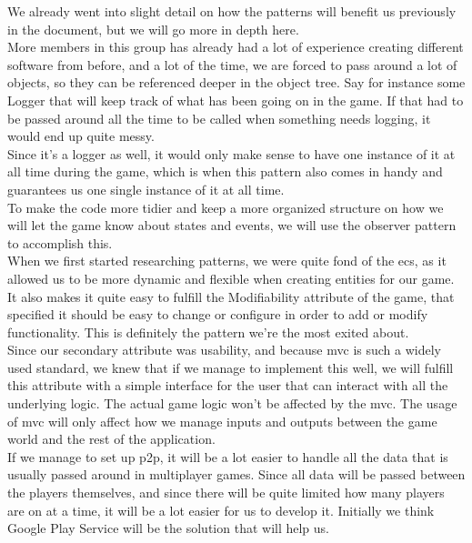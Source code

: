 We already went into slight detail on how the patterns will benefit us previously in the document, but we will go more in depth here. \\

More members in this group has already had a lot of experience creating different software from before, and a lot of the time, we are forced to pass around a lot of objects, so they can be referenced deeper in the object tree. Say for instance some Logger that will keep track of what has been going on in the game. If that had to be passed around all the time to be called when something needs logging, it would end up quite messy. \\

Since it's a logger as well, it would only make sense to have one instance of it at all time during the game, which is when this pattern also comes in handy and guarantees us one single instance of it at all time. \\

To make the code more tidier and keep a more organized structure on how we will let the game know about states and events, we will use the observer pattern to accomplish this. \\

When we first started researching patterns, we were quite fond of the \gls{ecs}, as it allowed us to be more dynamic and flexible when creating entities for our game. It also makes it quite easy to fulfill the Modifiability attribute of the game, that specified it should be easy to change or configure in order to add or modify functionality. This is definitely the pattern we're the most exited about. \\

Since our secondary attribute was usability, and because \gls{mvc} is such a widely used standard, we knew that if we manage to implement this well, we will fulfill this attribute with a simple interface for the user that can interact with all the underlying logic. The actual game logic won't be affected by the \gls{mvc}. The usage of \gls{mvc} will only affect how we manage inputs and outputs between the game world and the rest of the application. \\

If we manage to set up \gls{p2p}, it will be a lot easier to handle all the data that is usually passed around in multiplayer games. Since all data will be passed between the players themselves, and since there will be quite limited how many players are on at a time, it will be a lot easier for us to develop it. Initially we think Google Play Service will be the solution that will help us.
